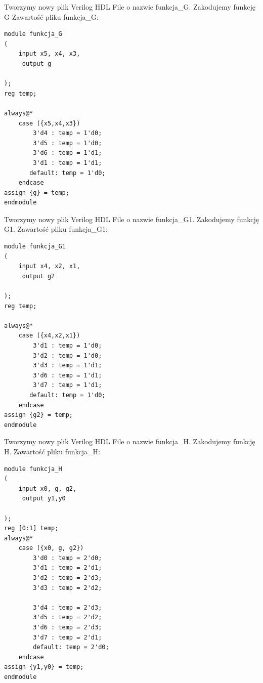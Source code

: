 \documentclass[]{article}
\begin{document}
Tworzymy nowy plik Verilog HDL File o nazwie funkcja\_G. Zakodujemy funkcję G
\newline
Zawartość pliku funkcja\_G:
\begin{lstlisting}[style={prettyverilog}]
module funkcja_G
(
    input x5, x4, x3,
	 output g

);
reg temp;

always@* 
	case ({x5,x4,x3}) 
		3'd4 : temp = 1'd0;
		3'd5 : temp = 1'd0;
		3'd6 : temp = 1'd1;
		3'd1 : temp = 1'd1;
	   default: temp = 1'd0;
    endcase
assign {g} = temp;	 
endmodule
\end{lstlisting}







Tworzymy nowy plik Verilog HDL File o nazwie funkcja\_G1. Zakodujemy funkcję G1.
\newline
Zawartość pliku funkcja\_G1:
\begin{lstlisting}[style={prettyverilog}]
module funkcja_G1
(
    input x4, x2, x1,
	 output g2

);
reg temp;

always@* 
	case ({x4,x2,x1}) 
		3'd1 : temp = 1'd0;
		3'd2 : temp = 1'd0;
		3'd3 : temp = 1'd1;
		3'd6 : temp = 1'd1;
		3'd7 : temp = 1'd1;
	   default: temp = 1'd0;
    endcase
assign {g2} = temp;	 
endmodule
\end{lstlisting}





Tworzymy nowy plik Verilog HDL File o nazwie funkcja\_H. Zakodujemy funkcję H.
\newline
Zawartość pliku funkcja\_H:
\begin{lstlisting}[style={prettyverilog}]
module funkcja_H
(
    input x0, g, g2,
	 output y1,y0

);
reg [0:1] temp;
always@* 
	case ({x0, g, g2}) 
		3'd0 : temp = 2'd0;
		3'd1 : temp = 2'd1;
		3'd2 : temp = 2'd3;
		3'd3 : temp = 2'd2;
		
		3'd4 : temp = 2'd3;
		3'd5 : temp = 2'd2;
		3'd6 : temp = 2'd3;
		3'd7 : temp = 2'd1;
	    default: temp = 2'd0;
    endcase
assign {y1,y0} = temp;	 
endmodule

\end{lstlisting}
\end{document}
